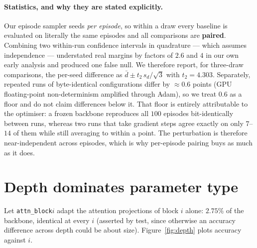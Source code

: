 \documentclass[11pt]{article}
\begin{document}
\paragraph{Statistics, and why they are stated explicitly.}
Our episode sampler seeds \emph{per episode}, so within a draw every baseline is
evaluated on literally the same episodes and all comparisons are \textbf{paired}.
Combining two within-run confidence intervals in quadrature --- which assumes
independence --- understated real margins by factors of $2.6$ and $4$ in our own early
analysis and produced one false null. We therefore report, for three-draw comparisons,
the per-seed difference as $\bar{d} \pm t_{2}\,s_d/\sqrt{3}$ with $t_2 = 4.303$.
Separately, repeated runs of byte-identical configurations differ by $\approx 0.6$
points (GPU floating-point non-determinism amplified through Adam), so we treat
$0.6$ as a floor and do not claim differences below it. That floor is entirely
attributable to the optimiser: a frozen backbone reproduces all $100$ episodes
bit-identically between runs, whereas two runs that take gradient steps agree exactly on
only $7$--$14$ of them while still averaging to within a point. The perturbation is
therefore near-independent across episodes, which is why per-episode pairing buys as
much as it does.

\section{Depth dominates parameter type}
\label{sec:depth}

Let \texttt{attn\_block}$i$ adapt the attention projections of block $i$ alone:
$2.75\%$ of the backbone, identical at every $i$ (asserted by test, since otherwise an
accuracy difference across depth could be about size). Figure~\ref{fig:depth} plots
accuracy against $i$.
\end{document}
